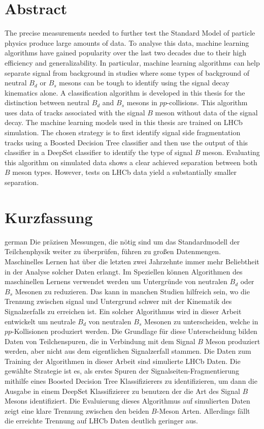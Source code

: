 \thispagestyle{plain}

\section*{Abstract}
The precise measurements needed to further test the Standard Model of particle physics produce large amounts of data.
To analyse this data, machine learning algorithms have gained popularity over the last two decades due to their high efficiency and generalizability.
In particular, machine learning algorithms can help separate signal from background in studies where some types of background of neutral $B_d$ or $B_s$ mesons can be tough to identify using the signal decay kinematics alone.
A classification algorithm is developed in this thesis for the distinction between neutral $B_d$ and $B_s$ mesons in $pp$-collisions.
This algorithm uses data of tracks associated with the signal $B$ meson without data of the signal decay. 
The machine learning models used in this thesis are trained on LHCb simulation. 
The chosen strategy is to first identify signal side fragmentation tracks using a Boosted Decision Tree classifier and then use the output of this classifier in a DeepSet classifier to identify the type of signal $B$ meson.
Evaluating this algorithm on simulated data shows a clear achieved separation between both $B$ meson types.
However, tests on LHCb data yield a substantially smaller separation.

\section*{Kurzfassung}
\begin{foreignlanguage}{german}
    Die präzisen Messungen, die nötig sind um das Standardmodell der Teilchenphysik weiter zu überprüfen, führen zu großen Datenmengen.
    Maschinelles Lernen hat über die letzten zwei Jahrzehnte immer mehr Beliebtheit in der Analyse solcher Daten erlangt.
    Im Speziellen können Algorithmen des maschinellen Lernens verwendet werden um Untergründe von neutralen $B_d$ oder $B_s$ Mesonen zu reduzieren.
    Das kann in manchen Studien hilfreich sein, wo die Trennung zwischen signal und Untergrund schwer mit der Kinematik des Signalzerfalls zu erreichen ist.
    Ein solcher Algorithmus wird in dieser Arbeit entwickelt um neutrale $B_d$ von neutralen $B_s$ Mesonen zu unterscheiden, welche in $pp$-Kollisionen produziert werden.
    Die Grundlage für diese Unterscheidung bilden Daten von Teilchenspuren, die in Verbindung mit dem Signal $B$ Meson produziert werden, aber nicht aus dem eigentlichen Signalzerfall stammen.
    Die Daten zum Training der Algorithmen in dieser Arbeit sind simulierte LHCb Daten.
    Die gewählte Strategie ist es, als erstes Spuren der Signalseiten-Fragmentierung mithilfe eines Boosted Decision Tree Klassifizierers zu identifizieren,
    um dann die Ausgabe in einem DeepSet Klassifizierer zu benutzen der die Art des Signal $B$ Mesons identifiziert.
    Die Evaluierung dieses Algorithmus auf simulierten Daten zeigt eine klare Trennung zwischen den beiden $B$-Meson Arten.
    Allerdings fällt die erreichte Trennung auf LHCb Daten deutlich geringer aus.
\end{foreignlanguage}

